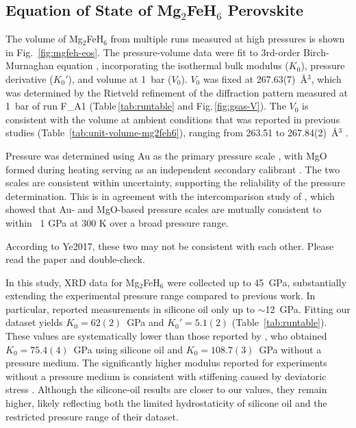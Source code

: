 \documentclass[draft,jgrga,12pt]{agujournal2019}
\begin{document}
\subsection{Equation of State of Mg$_2$FeH$_6$ Perovskite}

The volume of Mg$_2$FeH$_6$ from multiple runs measured at high pressures is shown in Fig.~\ref{fig:mgfeh-eos}. 
The pressure-volume data were fit to {} 3rd-order Birch-Murnaghan equation \cite{birch_elasticity_1952}, incorporating the isothermal bulk modulus ($K_0$), pressure derivative ($K_{0}'$), and volume at 1~bar ($V_0$). 
$V_0$ was fixed at 267.63(7)~\AA$^3$, which was determined by the Rietveld refinement of the diffraction pattern measured at 1~bar of run F\_A1 (Table\,\ref{tab:runtable} and Fig.\,\ref{fig:gsas-V}). 
The $V_0$ is consistent with the volume at ambient conditions that was reported in previous studies (Table~\ref{tab:unit-volume-mg2feh6}), ranging from 263.51 to 267.84(2)~\AA$^3$ \cite{george_bulk_2009, zhou_structural_2011, polanski_mg2feh6_2019, lang_insitu_2017, retuerto_neutron_2015, zareii_structural_2012, wang_preparation_2010, retuerto_highpressure_2010}. 


Pressure was determined using Au as the primary pressure scale \cite{fei_internally_2007}, with MgO formed during heating serving as an independent secondary calibrant \cite{dorogokupets_equations_2007}. 
The two scales are consistent within uncertainty, supporting the reliability of the pressure determination. 
This is in agreement with the intercomparison study of , which showed that Au- and MgO-based pressure scales are mutually consistent to within ~1 GPa at 300 K over a broad pressure range.
\begin{cbox}
According to Ye2017, these two may not be consistent with each other. Please read the paper and double-check. \\
\end{cbox}
In this study, XRD data for Mg$_2$FeH$_6$ were collected up to 45~{GPa}, substantially extending the experimental pressure range compared to previous work. 
In particular,  reported measurements in silicone oil only up to $\sim$12~{GPa}. 
Fitting our dataset yields $K_0 = 62(2)$~GPa and $K_0' = 5.1(2)$ (Table~\ref{tab:runtable}). 
These values are systematically lower than those reported by , who obtained $K_0 = 75.4(4)$~{GPa} using silicone oil and $K_0 = 108.7(3)$~{GPa} without a pressure medium. 
The significantly higher modulus reported for experiments without a pressure medium is consistent with stiffening caused by deviatoric stress \cite{mao_theory_2007}. 
Although the silicone-oil results are closer to our values, they remain higher, likely reflecting both the limited hydrostaticity of silicone oil and the restricted pressure range of their dataset.
\end{document}
